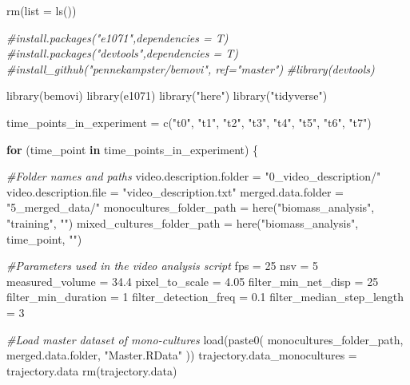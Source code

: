 \documentclass[
]{article}
\newenvironment{Shaded}{\begin{snugshade}}{\end{snugshade}}
\newcommand{\AttributeTok}[1]{\textcolor[rgb]{0.77,0.63,0.00}{#1}}
\newcommand{\CommentTok}[1]{\textcolor[rgb]{0.56,0.35,0.01}{\textit{#1}}}
\newcommand{\ControlFlowTok}[1]{\textcolor[rgb]{0.13,0.29,0.53}{\textbf{#1}}}
\newcommand{\DecValTok}[1]{\textcolor[rgb]{0.00,0.00,0.81}{#1}}
\newcommand{\FloatTok}[1]{\textcolor[rgb]{0.00,0.00,0.81}{#1}}
\newcommand{\FunctionTok}[1]{\textcolor[rgb]{0.00,0.00,0.00}{#1}}
\newcommand{\NormalTok}[1]{#1}
\newcommand{\OtherTok}[1]{\textcolor[rgb]{0.56,0.35,0.01}{#1}}
\newcommand{\StringTok}[1]{\textcolor[rgb]{0.31,0.60,0.02}{#1}}
\begin{document}
\begin{Shaded}
\begin{Highlighting}[]
\FunctionTok{rm}\NormalTok{(}\AttributeTok{list =} \FunctionTok{ls}\NormalTok{())}

\CommentTok{\#install.packages("e1071",dependencies = T)}
\CommentTok{\#install.packages("devtools",dependencies = T)}
\CommentTok{\#install\_github("pennekampster/bemovi", ref="master")}
\CommentTok{\#library(devtools)}

\FunctionTok{library}\NormalTok{(bemovi)}
\FunctionTok{library}\NormalTok{(e1071)}
\FunctionTok{library}\NormalTok{(}\StringTok{"here"}\NormalTok{)}
\FunctionTok{library}\NormalTok{(}\StringTok{"tidyverse"}\NormalTok{)}

\NormalTok{time\_points\_in\_experiment }\OtherTok{=} \FunctionTok{c}\NormalTok{(}\StringTok{"t0"}\NormalTok{, }\StringTok{"t1"}\NormalTok{, }\StringTok{"t2"}\NormalTok{, }\StringTok{"t3"}\NormalTok{, }\StringTok{"t4"}\NormalTok{, }\StringTok{"t5"}\NormalTok{, }\StringTok{"t6"}\NormalTok{, }\StringTok{"t7"}\NormalTok{)}

\ControlFlowTok{for}\NormalTok{ (time\_point }\ControlFlowTok{in}\NormalTok{ time\_points\_in\_experiment) \{}
  
  \CommentTok{\#Folder names and paths}
\NormalTok{  video.description.folder }\OtherTok{=} \StringTok{"0\_video\_description/"}
\NormalTok{  video.description.file }\OtherTok{=} \StringTok{"video\_description.txt"}
\NormalTok{  merged.data.folder }\OtherTok{=} \StringTok{"5\_merged\_data/"}
\NormalTok{  monocultures\_folder\_path }\OtherTok{=} \FunctionTok{here}\NormalTok{(}\StringTok{"biomass\_analysis"}\NormalTok{, }\StringTok{"training"}\NormalTok{, }\StringTok{""}\NormalTok{)}
\NormalTok{  mixed\_cultures\_folder\_path }\OtherTok{=} \FunctionTok{here}\NormalTok{(}\StringTok{"biomass\_analysis"}\NormalTok{, time\_point, }\StringTok{""}\NormalTok{)}
  
  \CommentTok{\#Parameters used in the video analysis script}
\NormalTok{  fps }\OtherTok{=} \DecValTok{25}
\NormalTok{  nsv }\OtherTok{=} \DecValTok{5}
\NormalTok{  measured\_volume }\OtherTok{=} \FloatTok{34.4}
\NormalTok{  pixel\_to\_scale }\OtherTok{=} \FloatTok{4.05}
\NormalTok{  filter\_min\_net\_disp }\OtherTok{=} \DecValTok{25}
\NormalTok{  filter\_min\_duration }\OtherTok{=} \DecValTok{1}
\NormalTok{  filter\_detection\_freq }\OtherTok{=} \FloatTok{0.1}
\NormalTok{  filter\_median\_step\_length }\OtherTok{=} \DecValTok{3}
  
  \CommentTok{\#Load master dataset of mono{-}cultures}
  \FunctionTok{load}\NormalTok{(}\FunctionTok{paste0}\NormalTok{(}
\NormalTok{    monocultures\_folder\_path,}
\NormalTok{    merged.data.folder,}
    \StringTok{"Master.RData"}
\NormalTok{  ))}
\NormalTok{  trajectory.data\_monocultures }\OtherTok{=}\NormalTok{ trajectory.data}
  \FunctionTok{rm}\NormalTok{(trajectory.data)}
  

\end{Highlighting}
\end{Shaded}
\end{document}

